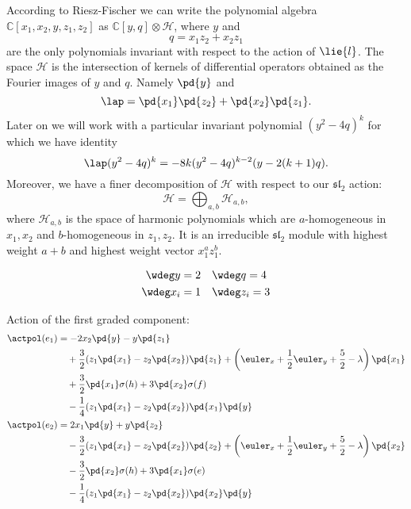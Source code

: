 According to Riesz-Fischer \cite{RF_1920} we can write the polynomial algebra $\mathbb{C}[x_1,x_2,y,z_1,z_2]$ as $\mathbb{C}[y,q] \otimes \mathcal{H}$, where $y$ and \[q = x_1z_2 + x_2 z_1\] are the only polynomials invariant with respect to the action of $\lie{l}$. The space $\mathcal{H}$ is the intersection of kernels of differential operators obtained as the Fourier images of $y$ and $q$. Namely $\pd{y}$ and
\[\lap = \pd{x_1}\pd{z_2} + \pd{x_2}\pd{z_1}.\]
Later on we will work with a particular invariant polynomial $(y^2 - 4q)^k$ for which we have identity
\[
\lap (y^2 - 4q)^k = -8k(y^2 - 4q)^{k-2}(y - 2(k+1)q).
\]
Moreover, we have a finer decomposition of $\mathcal{H}$ with respect to our $\mathfrak{sl}_2$ action:
\begin{equation}
    \mathcal{H} = \bigoplus_{a,b} \mathcal{H}_{a,b},
\end{equation}
where $\mathcal{H}_{a,b}$ is the space of harmonic polynomials which are $a$-homogeneous in $x_1, x_2$ and $b$-homogeneous in $z_1, z_2$. It is an irreducible $\mathfrak{sl}_2$ module with highest weight $a+b$ and highest weight vector $x_1^a z_1^b$. %

\begin{align}
    \wdeg y = 2 & \quad  \wdeg q = 4 \\
    \wdeg x_i = 1 & \quad  \wdeg z_i = 3
\end{align}

Action of the first graded component:
\begin{align}
    \actpol(e_1) &= -2 x_2 \pd{y} - y \pd{z_1} \\
             & \quad + \frac{3}{2} (z_1 \pd{x_1} - z_2 \pd{x_2}) \pd{z_1} + \left(\euler_x + \frac{1}{2}\euler_y + \frac{5}{2} - \lambda\right)\pd{x_1} \\
             & \quad + \frac{3}{2} \pd{x_1}\sigma(h) + 3 \pd{x_2} \sigma(f) \\
             & \quad - \frac{1}{4} (z_1 \pd{x_1} - z_2\pd{x_2})\pd{x_1}\pd{y}\\
    \actpol(e_2) &= 2 x_1 \pd{y} + y \pd{z_2} \\
             & \quad - \frac{3}{2} (z_1 \pd{x_1} - z_2 \pd{x_2}) \pd{z_2} + \left(\euler_x + \frac{1}{2}\euler_y + \frac{5}{2} - \lambda\right)\pd{x_2} \\
             & \quad - \frac{3}{2} \pd{x_2} \sigma(h) + 3 \pd{x_1} \sigma(e) \\
             & \quad - \frac{1}{4} (z_1 \pd{x_1} - z_2 \pd{x_2})\pd{x_2}\pd{y}
\end{align}

